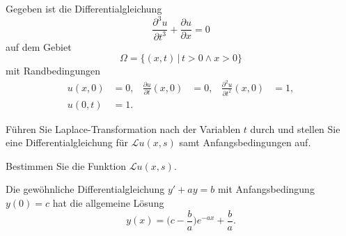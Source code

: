 Gegeben ist die Differentialgleichung
\begin{equation}
\frac{\partial^3 u}{\partial t^3}
+
\frac{\partial u}{\partial x}
=
0
\label{50000013:dgl}
\end{equation}
auf dem Gebiet
\[
\Omega = \{ (x,t)\,|\, t>0\wedge x > 0\}
\]
mit Randbedingungen
\begin{equation}
\begin{aligned}
u(x,0)&=0,
&
\frac{\partial u}{\partial t}(x,0)
&=
0,
&
\frac{\partial^2 u}{\partial t^2}(x,0)
&=1,
\\
u(0,t)&=1.
\end{aligned}
\end{equation}
\begin{teilaufgaben}
\item
Führen Sie Laplace-Trans\-for\-ma\-tion nach der Variablen $t$ durch und
stellen Sie eine Differentialgleichung für $\mathscr{L}u(x,s)$ samt
Anfangsbedingungen auf.
\item
Bestimmen Sie die Funktion $\mathscr{L}u(x,s)$.
\end{teilaufgaben}

\begin{hinweis}
Die gewöhnliche Differentialgleichung $y'+ay=b$ mit Anfangsbedingung $y(0)=c$
hat die allgemeine Lösung
\[
y(x) = \biggl(c-\frac{b}{a}\biggr)e^{-ax} + \frac{b}{a}.
\]
\end{hinweis}

